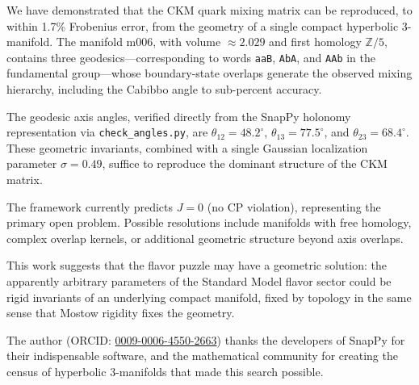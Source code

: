 \documentclass[12pt,prd,superscriptaddress,nofootinbib]{revtex4-2}
\begin{document}
We have demonstrated that the CKM quark mixing matrix can be reproduced, 
to within 1.7\% Frobenius error, from the geometry of a single compact 
hyperbolic 3-manifold. The manifold m006, with volume $\approx 2.029$ 
and first homology $\mathbb{Z}/5$, contains three geodesics---corresponding 
to words \texttt{aaB}, \texttt{AbA}, and \texttt{AAb} in the fundamental 
group---whose boundary-state overlaps generate the observed mixing 
hierarchy, including the Cabibbo angle to sub-percent accuracy.

The geodesic axis angles, verified directly from the SnapPy holonomy
representation via \texttt{check\_angles.py}, are
$\theta_{12} = 48.2^\circ$, $\theta_{13} = 77.5^\circ$,
and $\theta_{23} = 68.4^\circ$. These geometric invariants, combined
with a single Gaussian localization parameter $\sigma = 0.49$,
suffice to reproduce the dominant structure of the CKM matrix.

The framework currently predicts $J = 0$ (no CP violation), 
representing the primary open problem. Possible resolutions include 
manifolds with free homology, complex overlap kernels, or additional 
geometric structure beyond axis overlaps.

This work suggests that the flavor puzzle may have a geometric 
solution: the apparently arbitrary parameters of the Standard Model 
flavor sector could be rigid invariants of an underlying compact 
manifold, fixed by topology in the same sense that Mostow rigidity 
fixes the geometry.

\begin{acknowledgments}
The author (ORCID: \href{https://orcid.org/0009-0006-4550-2663}{0009-0006-4550-2663})
thanks the developers of SnapPy for their indispensable
software, and the mathematical community for creating the census of
hyperbolic 3-manifolds that made this search possible.
\end{acknowledgments}
\end{document}
